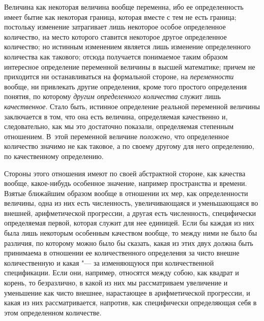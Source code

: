 Величина как некоторая величина вообще переменна, ибо ее определенность
имеет бытие как некоторая граница, которая вместе с тем не есть граница;
постольку изменение затрагивает лишь некоторое особое определенное
количество, на место которого ставится некоторое другое определенное
количество; но истинным изменением является лишь изменение определенного
количества как такового; отсюда получается понимаемое таким образом
интересное определение переменной величины в высшей математике; причем не
приходится ни останавливаться на формальной стороне, на
{\em переменности} вообще, ни привлекать другие
определения, кроме того простого определения понятия, по которому
{\em другим определенного количества} служит лишь
{\em качественное}. Стало быть, истинное определение
реальной переменной величины заключается в том, что она есть величина,
определяемая качественно и, следовательно, как мы это достаточно показали,
определяемая степенным отношением. В~этой переменной величине
{\em положено}, что определенное количество значимо не
как таковое, а по своему другому для него определению, по качественному
определению.

Стороны этого отношения имеют по своей абстрактной стороне, как качества
вообще, какое-нибудь особенное значение, например пространства и времени.
Взятые ближайшим образом вообще в отношении их мер, как определенности
величины, одна из них есть численность, увеличивающаяся и уменьшающаяся во
внешней, арифметической прогрессии, а другая есть численность, специфически
определяемая первой, которая служит для нее единицей. Если бы каждая из них
была лишь некоторым особенным качеством вообще, то между ними не было бы
различия, по которому можно было бы сказать, какая из этих двух должна быть
принимаема в отношении ее количественного определения за чисто внешне
количественную и какая "--- за изменяющуюся при количественной спецификации.
Если они, например, относятся между собою, как квадрат и корень, то
безразлично, в какой из них мы рассматриваем увеличение и уменьшение как
чисто внешнее, нарастающее в арифметической прогрессии, и какая из них
рассматривается, напротив, как специфически определяющая себя в этом
определенном количестве.

